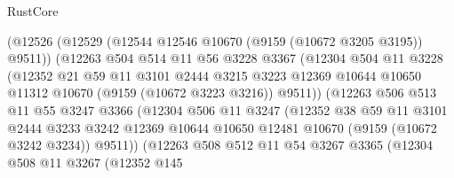 \begin{lexlean}{RustCore}
\begin{coremodule}
                        (@12526
                          (@12529 (@12544 @12546 @10670 (@9159 (@10672 @3205 @3195)) @9511))
                          (@12263
                            @504
                            @514
                            @11
                            @56
                            @3228
                            @3367
                            (@12304
                              @504
                              @11
                              @3228
                              (@12352
                                @21
                                @59
                                @11
                                @3101
                                @2444
                                @3215
                                @3223
                                @12369
                                @10644
                                @10650
                                @11312
                                @10670
                                (@9159 (@10672 @3223 @3216))
                                @9511))
                            (@12263
                              @506
                              @513
                              @11
                              @55
                              @3247
                              @3366
                              (@12304
                                @506
                                @11
                                @3247
                                (@12352
                                  @38
                                  @59
                                  @11
                                  @3101
                                  @2444
                                  @3233
                                  @3242
                                  @12369
                                  @10644
                                  @10650
                                  @12481
                                  @10670
                                  (@9159 (@10672 @3242 @3234))
                                  @9511))
                              (@12263
                                @508
                                @512
                                @11
                                @54
                                @3267
                                @3365
                                (@12304
                                  @508
                                  @11
                                  @3267
                                  (@12352
                                    @145

\end{coremodule}
\end{lexlean}
